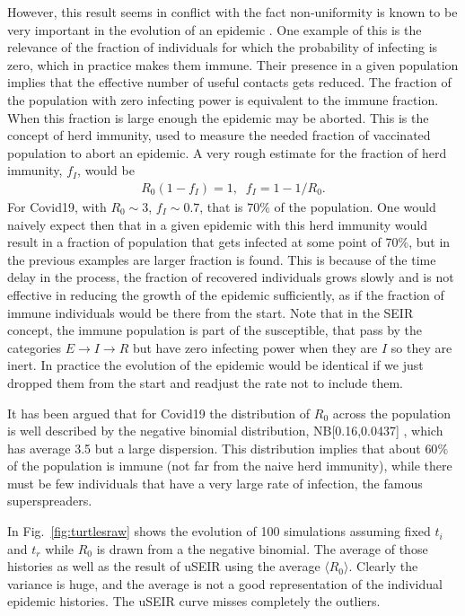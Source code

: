 \documentclass[a4paper,oneside,11pt]{article}
\begin{document}
 However, this result seems in conflict with the fact non-uniformity is known to be very important in the evolution of an epidemic \cite{}. One example of this is the relevance of the fraction of individuals for which the probability of infecting is zero, which in practice makes them immune. Their presence in a given population implies that the effective number of useful contacts gets reduced. The fraction of the population with zero infecting power is equivalent to the immune fraction. When this fraction is large enough  the epidemic may be aborted. This is the concept of herd immunity, used to measure the needed fraction of vaccinated population to abort an epidemic. A very rough estimate for the fraction of herd immunity, $f_I$, would be
   \begin{eqnarray}
  R_0 (1- f_I)  =1, \;\; f_I= 1-1/R_0.
   \end{eqnarray}
   For Covid19, with $R_0 \sim 3$, $f_I \sim 0.7$, that is $70\%$ of the population. One would naively expect then that in a given epidemic with this herd immunity would result in a fraction of  population that gets infected at some point of 70$\%$, but in the previous examples are larger fraction is found. This is because of the time delay in the process, the fraction of recovered individuals grows slowly and is not effective in reducing the growth of the epidemic sufficiently, as if the fraction of immune individuals would be there from the start. Note that in the SEIR concept, the immune population is part of the susceptible, that pass by the categories $E\rightarrow I \rightarrow R$ but have zero infecting power when they are $I$ so they are inert. In practice the evolution of the epidemic would be identical if we just dropped them from the start and readjust the rate not to include them. 
 
  It has been argued that for Covid19 the distribution of $R_0$ across the population is well described by the negative binomial distribution, NB[0.16,0.0437] \cite{}, which has average 3.5 but a large dispersion. This distribution implies that about $60\%$ of the population is immune  (not far from the naive herd immunity), while there must be few individuals that have a very large rate of infection, the famous superspreaders.

  In Fig.~\ref{fig:turtlesraw} shows the evolution of 100 simulations assuming fixed $t_i$ and $t_r$ while $R_0$ is drawn from a the negative binomial. The average of those histories as well as the result of
  uSEIR using the average $\langle R_0\rangle$. Clearly the variance is huge, and the average is not a good representation of the individual epidemic histories. The uSEIR curve misses completely the outliers.
\end{document}
